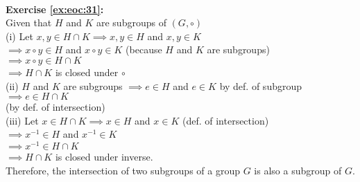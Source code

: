 \\
\textbf{Exercise \ref{ex:eoc:31}:}\\
Given that $H$ and $K$ are subgroups of $(G,\circ)$\\
(i) Let $x,y\in H\cap K \implies x,y\in H$ and $x,y\in K$\\
$\implies x\circ y\in H$ and $x\circ y\in K$ (because $H$ and $K$ are subgroups)\\
$\implies x\circ y\in H\cap K$\\
$\implies H\cap K$ is closed under $\circ$\\
(ii) $H$ and $K$ are subgroups $\implies e\in H$ and $e\in K$ by def. of subgroup\\
$\implies e\in H\cap K$\\ (by def. of intersection)\\
(iii) Let $x\in H\cap K \implies x\in H$ and $x\in K$ (def. of intersection)\\
$\implies x^{-1}\in H$ and $x^{-1}\in K$\\
$\implies x^{-1}\in H\cap K$\\
$\implies H\cap K$ is closed under inverse.\\
Therefore, the intersection of two subgroups of a group $G$ is also a subgroup of $G$.\\